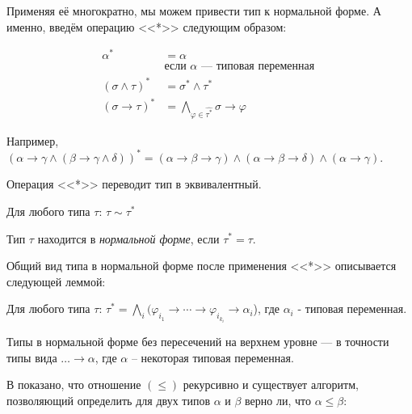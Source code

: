 \documentclass[../main.tex]{subfiles}
\begin{document}
Применяя её многократно, мы можем привести тип к нормальной форме. А именно, введём операцию <<*>> следующим образом: 

\begin{definition}
\begin{align*}
\alpha^* &= \alpha \\
    &\text{если $\alpha$ --- типовая переменная }\\
(\sigma \wedge \tau)^* &= \sigma^* \wedge \tau^*\\
(\sigma \to \tau)^* &= \bigwedge \limits_{\varphi \in \hat{\tau^*}} \sigma \to \varphi
\end{align*}
\end{definition}

Например, $(\alpha \to \gamma \wedge (\beta \to \gamma \wedge \delta))^* = (\alpha \to \beta \to \gamma) \wedge (\alpha \to \beta \to \delta) \wedge (\alpha \to \gamma)$.

Операция <<*>> переводит тип в эквивалентный.

\begin{lemma} \label{normal form}
Для любого типа $\tau$: $\tau \sim \tau^*$
\end{lemma}


\begin{definition}
Тип $\tau$ находится в {\it нормальной форме}, если $\tau^* = \tau$.
\end{definition}

Общий вид типа в нормальной форме после применения <<*>> описывается следующей леммой:

\begin{lemma}
Для любого типа $\tau$: $\tau^* = \bigwedge \limits_i (\varphi_i_1 \to \cdots \to \varphi_i_{k_i} \to \alpha_i$), где $\alpha_i$ - типовая переменная.
\end{lemma}

\begin{corollary} \label{normal form unit}
Типы в нормальной форме без пересечений на верхнем уровне --- в точности типы вида $\dots \to \alpha$, где $\alpha$ -- некоторая типовая переменная.
\end{corollary}

В \cite{hindley_82} показано, что отношение $(\leqslant)$ рекурсивно и существует алгоритм, позволяющий определить для двух типов $\alpha$ и $\beta$ верно ли, что $\alpha \leqslant \beta$:
\end{document}
